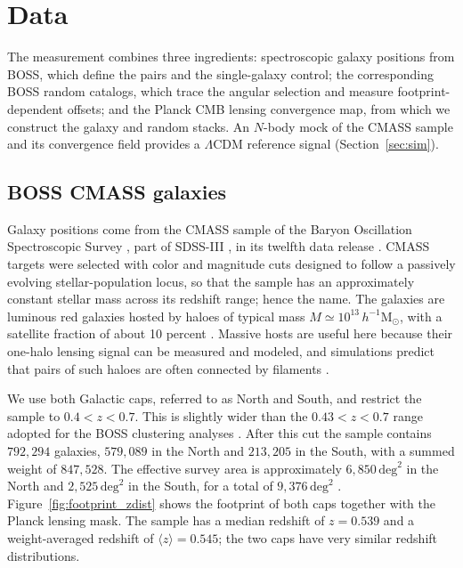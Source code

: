 %
%
%

\section{Data}
\label{sec:data}

The measurement combines three ingredients: spectroscopic galaxy positions
from BOSS, which define the pairs and the single-galaxy control; the
corresponding BOSS random catalogs, which trace the angular selection and
measure footprint-dependent offsets; and the Planck CMB lensing convergence
map, from which we construct the galaxy and random stacks. An $N$-body mock
of the CMASS sample and its convergence field provides a $\Lambda$CDM
reference signal
(Section~\ref{sec:sim}).

\subsection{BOSS CMASS galaxies}
\label{sec:data_cmass}

Galaxy positions come from the CMASS sample of the Baryon Oscillation
Spectroscopic Survey \citep[BOSS;][]{Dawson2013}, part of SDSS-III
\citep{Eisenstein2011}, in its twelfth data release
\citep{Alam2015, Reid2016}. CMASS targets were selected with color and
magnitude cuts designed to follow a passively evolving stellar-population
locus, so that the sample has an approximately constant stellar mass across
its redshift range; hence the name. The galaxies are luminous red galaxies
hosted by haloes of typical mass $M\simeq10^{13}\,h^{-1}\mathrm{M}_{\odot}$,
with a satellite fraction of about 10 percent \citep{White2011}. Massive
hosts are useful here because their one-halo lensing signal can be measured
and modeled, and simulations predict that pairs of such haloes are often
connected by filaments \citep{Colberg2005}.

We use both Galactic caps, referred to as North and South, and restrict the
sample to $0.4<z<0.7$. This is slightly wider than the $0.43<z<0.7$ range
adopted for the BOSS clustering analyses \citep{Reid2016}.
After this cut the sample contains $792{,}294$ galaxies, $579{,}089$ in the
North and $213{,}205$ in the South, with a summed weight of $847{,}528$.
The effective survey area is approximately $6{,}850\,\mathrm{deg}^{2}$ in the
North and $2{,}525\,\mathrm{deg}^{2}$ in the South, for a total of
$9{,}376\,\mathrm{deg}^{2}$ \citep{Reid2016}. %
Figure~\ref{fig:footprint_zdist} shows the footprint of both caps together
with the Planck lensing mask. The sample has a median redshift of $z=0.539$
and a weight-averaged redshift of $\langle z\rangle=0.545$; the two caps have
very similar redshift distributions.

